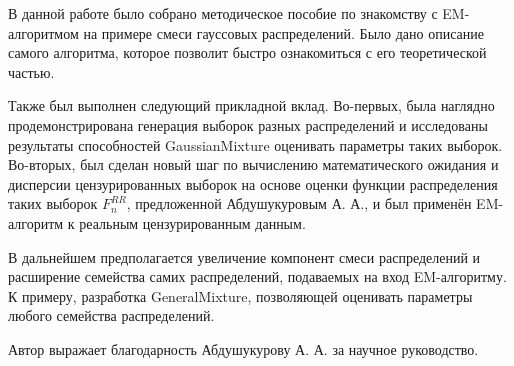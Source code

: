     В данной работе было собрано методическое пособие по знакомству с EM-алгоритмом на примере смеси гауссовых распределений. Было дано описание самого алгоритма, которое позволит быстро ознакомиться с его теоретической частью.
    
    Также был выполнен следующий прикладной вклад. Во-первых, была наглядно продемонстрирована генерация выборок разных распределений и исследованы результаты способностей GaussianMixture оценивать параметры таких выборок. Во-вторых, был сделан новый шаг по вычислению математического ожидания и дисперсии цензурированных выборок на основе оценки функции распределения таких выборок $F_n^{RR}$, предложенной Абдушукуровым А. А., и был применён EM-алгоритм к реальным цензурированным данным.
    
    В дальнейшем предполагается увеличение компонент смеси распределений и расширение семейства самих распределений, подаваемых на вход EM-алгоритму. К примеру, разработка GeneralMixture, позволяющей оценивать параметры любого семейства распределений.
    
    Автор выражает благодарность Абдушукурову А. А. за научное руководство.